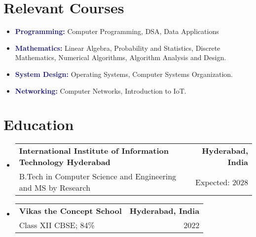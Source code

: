 \documentclass[a4paper,10pt]{article}
\makeatletter
\newcommand{\resumeSubheading}[4]{
  \vspace{-2pt}\item
    \begin{tabular*}{0.97\textwidth}[t]{l@{\extracolsep{\fill}}r}
      \textbf{#1} & \textbf{\small #2} \\
      {\small #3} & {\small #4} \\
    \end{tabular*}\vspace{-7pt}
}
\makeatother
\begin{document}
\section{\textcolor{headercolor}{Relevant Courses}}
\begin{multicols}{2}
    \begin{itemize}[leftmargin=0.15in, label={}]
        \item \textbf{\textcolor{MidnightBlue}{Programming:}} Computer Programming, DSA, Data Applications
        \item \textbf{\textcolor{MidnightBlue}{Mathematics:}} Linear Algebra, Probability and Statistics, Discrete Mathematics, Numerical Algorithms, Algorithm Analysis and Design.
        \item \textbf{\textcolor{MidnightBlue}{System Design:}} Operating Systems, Computer Systems Organization.
        \item \textbf{\textcolor{MidnightBlue}{Networking:}} Computer Networks, Introduction to IoT.
    \end{itemize}
\end{multicols}

\section{Education}
\begin{itemize}[leftmargin=0.15in, label={}]
    \resumeSubheading
        {International Institute of Information Technology Hyderabad}{Hyderabad, India}
        {B.Tech in Computer Science and Engineering and MS by Research}{Expected: 2028}
    \resumeSubheading
        {Vikas the Concept School}{Hyderabad, India}
        {Class XII CBSE; 84\%}{2022}
\end{itemize}
\end{document}
